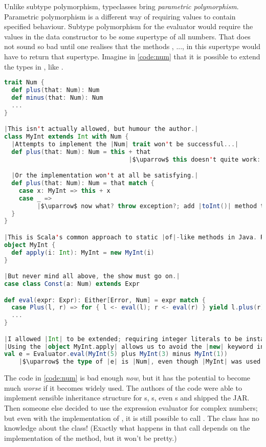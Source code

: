 \documentclass[10 pt]{article}
\begin{document}
Unlike subtype polymorphism, typeclasses bring \emph{parametric polymorphism}. Parametric polymorphism is a different way of requiring values to contain specified behaviour. Subtype polymorphism for the evaluator would require the values in the  data constructor to be some supertype of all numbers. That does not sound so bad until one realises that the methods , ...,  in this supertype would have to return that supertype. Imagine in \autoref{code:num} that it is possible to extend the types in , like .

\begin{lstlisting}[caption={Exploring the Num supertype}, label={code:num}, language=Scala, escapechar=|]
trait Num {
  def plus(that: Num): Num
  def minus(that: Num): Num
  ...
}

|This isn't actually allowed, but humour the author.|
class MyInt extends Int with Num {
  |Attempts to implement the |Num| trait won't be successful...|
  def plus(that: Num): Num = this + that 
                                  |$\uparrow$ this doesn't quite work: can't add |Int| and |Num|.|

  |Or the implementation won't at all be satisfying.|
  def plus(that: Num): Num = that match {
    case x: MyInt => this + x
    case _ => 
         |$\uparrow$ now what? throw exception?; add |toInt()| method to |Num|?|
  }
}

|This is Scala's common approach to static |of|-like methods in Java. Recall |Optional.of| and similar.|
object MyInt {
  def apply(i: Int): MyInt = new MyInt(i)
}

|But never mind all above, the show must go on.|
case class Const(a: Num) extends Expr

def eval(expr: Expr): Either[Error, Num] = expr match {
  case Plus(l, r) => for { l <- eval(l); r <- eval(r) } yield l.plus(r)
  ...
}

|I allowed |Int| to be extended; requiring integer literals to be instances of |MyInt| is too much!|
|Using the |object MyInt.apply| allows us to avoid the |new| keyword in this case.|
val e = Evaluator.eval(MyInt(5) plus MyInt(3) minus MyInt(1))
    |$\uparrow$ the type of |e| is |Num|, even though |MyInt| was used.|
\end{lstlisting}

The code in \autoref{code:num} is bad enough \emph{now}, but it has the potential to become much \emph{worse} if it becomes widely used. The authors of the code were able to implement sensible inheritance structure for s, s, even s and shipped the JAR. Then someone else decided to use the expression evaluator for complex numbers; but even with the implementation of , it is still possible to call . The class  has no knowledge about the  class! (Exactly what happens in that call depends on the implementation of the  method, but it won't be pretty.)
\end{document}
